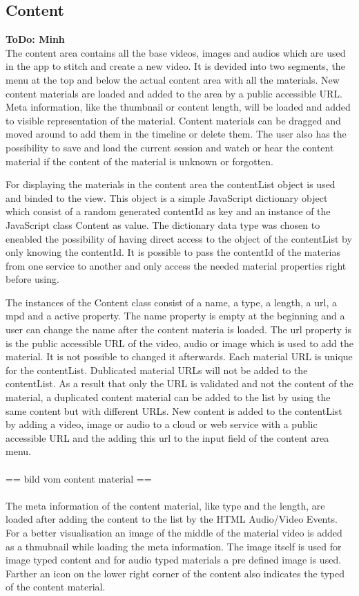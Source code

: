 \documentclass[conference]{IEEEtran}
\begin{document}
\newpage

\subsection{Content}
\textbf{ToDo: Minh} \\
The content area contains all the base videos, images and audios which are used in the app to stitch and create a new video. It is devided into two segments, the menu at the top and below the actual content area with all the materials. New content materials are loaded and added to the area by a public accessible URL. Meta information, like the thumbnail or content length, will be loaded and added to visible representation of the material. Content materials can be dragged and moved around to add them in the timeline or delete them. The user also has the possibility to save and load the current session and watch or hear the content material if the content of the material is unknown or forgotten.

For displaying the materials in the content area the contentList object is used and binded to the view. This object is a simple JavaScript dictionary object which consist of a random generated contentId as key and an instance of the JavaScript class Content as value. The dictionary data type was chosen to eneabled the possibility of having direct access to the object of the contentList by only knowing the contentId. It is possible to pass the contentId of the materias from one service to another and only access the needed material properties right before using.

The instances of the Content class consist of a name, a type, a length, a url, a mpd and a active property. The name property is empty at the beginning and a user can change the name after the content materia is loaded. The url property is is the public accessible URL of the video, audio or image which is used to add the material. It is not possible to changed it afterwards. Each material URL is unique for the contentList. Dublicated material URLs will not be added to the contentList. As a result that only the URL is validated and not the content of the material, a duplicated content material can be added to the list by using the same content but with different URLs. New content is added to the contentList by adding a video, image or audio to a cloud or web service with a public accessible URL and the adding this url to the input field of the content area menu.\\
\\
== bild vom content material ==\\
\\
The meta information of the content material, like type and the length, are loaded after adding the content to the list by the HTML Audio/Video Events. For a better visualisation an image of the middle of the material video is added as a thmubnail while loading the meta information. The image itself is used for image typed content and for audio typed materials a pre defined image is used. Farther an icon on the lower right corner of the content also indicates the typed of the content material.
\end{document}
